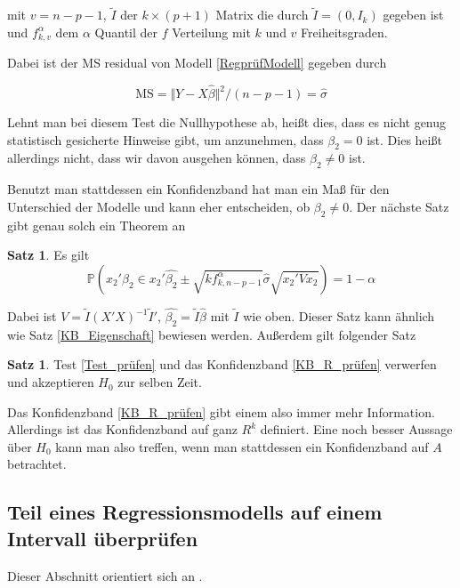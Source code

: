 \documentclass[12pt,a4paper]{article}
\theoremstyle{definition}
\theoremstyle{definition}
\newtheorem{Satz}[Definition]{Satz}
\theoremstyle{definition}
\theoremstyle{definition}
\begin{document}
mit $v=n-p-1$, $\tilde{I}$ der $k \times (p+1)$ Matrix die durch $\tilde{I}=(0,I_k)$ gegeben ist und $f^{\alpha}_{k,v}$ dem $\alpha$ Quantil der $f$ Verteilung mit $k$ und $v$ Freiheitsgraden.

Dabei ist der MS residual von Modell \eqref{RegprüfModell} gegeben durch

\begin{equation*}
\text{MS} = \Vert Y - X\hat{\beta} \Vert^2 / (n-p-1) = \hat{\sigma}
\end{equation*}

Lehnt man bei diesem Test die Nullhypothese ab, heißt dies, dass es nicht genug statistisch gesicherte Hinweise gibt, um anzunehmen, dass $\beta_{2} = 0$ ist. Dies heißt allerdings nicht, dass wir davon ausgehen können, dass $\beta_2 \neq 0$ ist. 

Benutzt man stattdessen ein Konfidenzband hat man ein Maß für den Unterschied der Modelle und kann eher entscheiden, ob $\beta_2 \neq 0$. Der nächste Satz gibt genau solch ein Theorem an

\begin{Satz}
Es gilt
\begin{equation} \label{KB_R_prüfen}
\mathbb{P}(x_2'\beta_2 \in x_2'\hat{\beta_2} \pm \sqrt{k f^{\alpha}_{k,n-p-1}} \hat{\sigma} \sqrt{x_2' V x_2}) = 1 - \alpha
\end{equation}
\end{Satz}

Dabei ist $V=\tilde{I}(X'X)^{-1}\tilde{I}'$, $\hat{\beta_2} = \tilde{I} \hat{\beta}$ mit $\tilde{I}$ wie oben. Dieser Satz kann ähnlich wie Satz \eqref{KB_Eigenschaft} bewiesen werden. Außerdem gilt folgender Satz

\begin{Satz}
Test \eqref{Test_prüfen} und das Konfidenzband \eqref{KB_R_prüfen} verwerfen und akzeptieren $H_0$ zur selben Zeit.
\end{Satz}

Das Konfidenzband \eqref{KB_R_prüfen} gibt einem also immer mehr Information. Allerdings ist das Konfidenzband auf ganz $R^k$ definiert. Eine noch besser Aussage über $H_0$ kann man also treffen, wenn man stattdessen ein Konfidenzband auf $A$ betrachtet. 

\subsection{Teil eines Regressionsmodells auf einem Intervall überprüfen}
\label{Teil eines Regressionsmodells auf einem Intervall überpruefen}
Dieser Abschnitt orientiert sich an \cite[102-105]{Liu64}.
\end{document}
